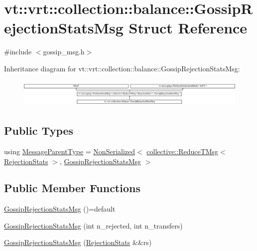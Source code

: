 \hypertarget{structvt_1_1vrt_1_1collection_1_1balance_1_1_gossip_rejection_stats_msg}{}\section{vt\+:\+:vrt\+:\+:collection\+:\+:balance\+:\+:Gossip\+Rejection\+Stats\+Msg Struct Reference}
\label{structvt_1_1vrt_1_1collection_1_1balance_1_1_gossip_rejection_stats_msg}


{\ttfamily \#include $<$gossip\+\_\+msg.\+h$>$}

Inheritance diagram for vt\+:\+:vrt\+:\+:collection\+:\+:balance\+:\+:Gossip\+Rejection\+Stats\+Msg\+:\begin{figure}[H]
\begin{center}
\leavevmode
\includegraphics[height=1.365854cm]{structvt_1_1vrt_1_1collection_1_1balance_1_1_gossip_rejection_stats_msg}
\end{center}
\end{figure}
\subsection*{Public Types}
\begin{DoxyCompactItemize}
\item 
using \hyperlink{structvt_1_1vrt_1_1collection_1_1balance_1_1_gossip_rejection_stats_msg_a675d210553e1b0b82f070a6cc762c3ba}{Message\+Parent\+Type} = \hyperlink{namespacevt_a378e4a02213923b4ba1c3f9d2a1424c7}{Non\+Serialized}$<$ \hyperlink{namespacevt_1_1collective_a28b82d5d48c9bc6e4fd738fcbf9e0f62}{collective\+::\+Reduce\+T\+Msg}$<$ \hyperlink{structvt_1_1vrt_1_1collection_1_1balance_1_1_rejection_stats}{Rejection\+Stats} $>$, \hyperlink{structvt_1_1vrt_1_1collection_1_1balance_1_1_gossip_rejection_stats_msg}{Gossip\+Rejection\+Stats\+Msg} $>$
\end{DoxyCompactItemize}
\subsection*{Public Member Functions}
\begin{DoxyCompactItemize}
\item 
\hyperlink{structvt_1_1vrt_1_1collection_1_1balance_1_1_gossip_rejection_stats_msg_adbea19c2c7d7b7f99744fe67cae6b6ce}{Gossip\+Rejection\+Stats\+Msg} ()=default
\item 
\hyperlink{structvt_1_1vrt_1_1collection_1_1balance_1_1_gossip_rejection_stats_msg_a3234e7b694410ec6c7a3aabf25beee3a}{Gossip\+Rejection\+Stats\+Msg} (int n\+\_\+rejected, int n\+\_\+transfers)
\item 
\hyperlink{structvt_1_1vrt_1_1collection_1_1balance_1_1_gossip_rejection_stats_msg_a51696eab8eafcac48ba8394edae58172}{Gossip\+Rejection\+Stats\+Msg} (\hyperlink{structvt_1_1vrt_1_1collection_1_1balance_1_1_rejection_stats}{Rejection\+Stats} \&\&rs)
\end{DoxyCompactItemize}
